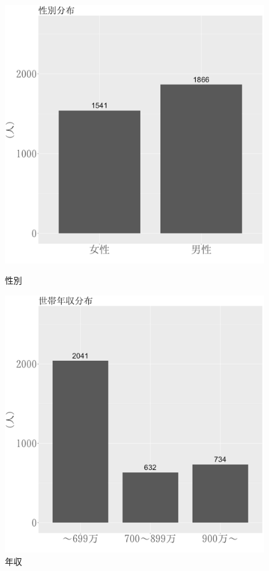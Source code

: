 \documentclass[11pt]{jsarticle}
\begin{document}
\begin{figure}
 \begin{minipage}{0.5\columnwidth}
  \centering
  \includegraphics[width=\columnwidth]{./fig/3-2-2_seibetsu.png}
  \caption{性別}
  \label{fig:consumer_sex}
 \end{minipage}
 \begin{minipage}{0.5\columnwidth}
  \centering
  \includegraphics[width=\columnwidth]{./fig/3-2-2_nensyu.png}
  \caption{年収}
  \label{fig:consumer_annal_income}
 \end{minipage}
\end{figure}
\end{document}

